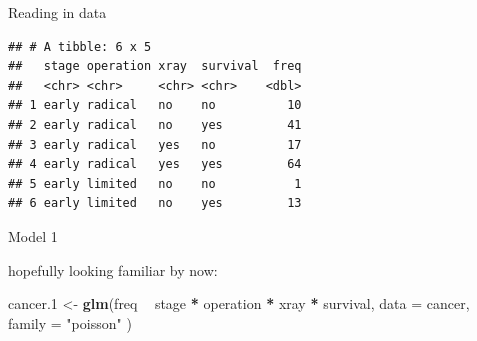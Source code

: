\documentclass[ignorenonframetext,]{beamer}
\newenvironment{Shaded}{\begin{snugshade}}{\end{snugshade}}
\newcommand{\DataTypeTok}[1]{\textcolor[rgb]{0.13,0.29,0.53}{#1}}
\newcommand{\DecValTok}[1]{\textcolor[rgb]{0.00,0.00,0.81}{#1}}
\newcommand{\FloatTok}[1]{\textcolor[rgb]{0.00,0.00,0.81}{#1}}
\newcommand{\KeywordTok}[1]{\textcolor[rgb]{0.13,0.29,0.53}{\textbf{#1}}}
\newcommand{\NormalTok}[1]{#1}
\newcommand{\OperatorTok}[1]{\textcolor[rgb]{0.81,0.36,0.00}{\textbf{#1}}}
\newcommand{\StringTok}[1]{\textcolor[rgb]{0.31,0.60,0.02}{#1}}
\begin{document}
\begin{frame}[fragile]{Reading in data}
\protect\hypertarget{reading-in-data}{}

\small

\begin{Shaded}
\end{Shaded}

\begin{verbatim}
## # A tibble: 6 x 5
##   stage operation xray  survival  freq
##   <chr> <chr>     <chr> <chr>    <dbl>
## 1 early radical   no    no          10
## 2 early radical   no    yes         41
## 3 early radical   yes   no          17
## 4 early radical   yes   yes         64
## 5 early limited   no    no           1
## 6 early limited   no    yes         13
\end{verbatim}

\normalsize

\end{frame}

\begin{frame}[fragile]{Model 1}
\protect\hypertarget{model-1}{}

hopefully looking familiar by now:

\begin{Shaded}
\begin{Highlighting}[]
\NormalTok{cancer}\FloatTok{.1}\NormalTok{ <-}\StringTok{ }\KeywordTok{glm}\NormalTok{(freq }\OperatorTok{~}\StringTok{ }\NormalTok{stage }\OperatorTok{*}\StringTok{ }\NormalTok{operation }\OperatorTok{*}\StringTok{ }\NormalTok{xray }\OperatorTok{*}\StringTok{ }\NormalTok{survival,}
  \DataTypeTok{data =}\NormalTok{ cancer, }\DataTypeTok{family =} \StringTok{"poisson"}
\NormalTok{)}
\end{Highlighting}
\end{Shaded}

\end{frame}
\end{document}
